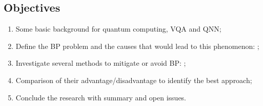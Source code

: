 \subsection{Objectives}

\begin{enumerate}
    \item Some basic background for quantum computing, VQA and QNN;
    \item Define the BP problem and the causes that would lead to this phenomenon: \cite{wangNoiseinducedBarrenPlateaus2021,zhaoAnalyzingBarrenPlateau2021};
    \item Investigate several methods to mitigate or avoid BP: \cite{pesahAbsenceBarrenPlateaus2021, pattiEntanglementDevisedBarren2021,liuParameterInitializationMethod2021};
    \item Comparison of their advantage/disadvantage to identify the best approach;
    \item Conclude the research with summary and open issues.
\end{enumerate}